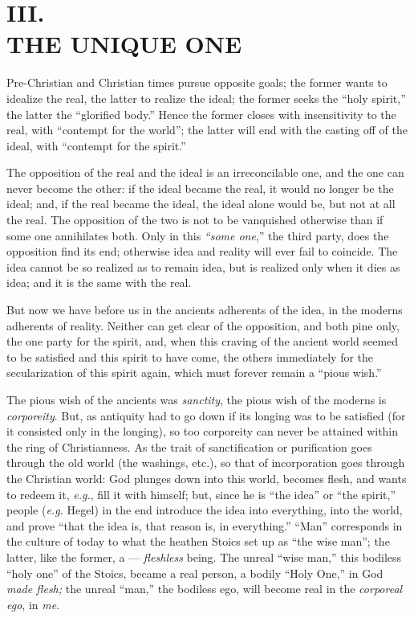 
\chapter[III. The Unique One]{\centering III.\\
THE UNIQUE ONE}

Pre-Christian and Christian times pursue opposite goals; the former wants to 
idealize the real, the latter to realize the ideal; the former seeks the 
``holy spirit,'' the latter the ``glorified body.'' Hence the former 
closes with insensitivity to the real, with ``contempt for the world''; the 
latter will end with the casting off of the ideal, with ``contempt for the 
spirit.''

The opposition of the real and the ideal is an irreconcilable one, and the one 
can never become the other: if the ideal became the real, it would no longer 
be the ideal; and, if the real became the ideal, the ideal alone would be, but 
not at all the real. The opposition of the two is not to be vanquished 
otherwise than if some one annihilates both. Only in this \textit{``some 
one},'' the third party, does the opposition find its end; otherwise idea and 
reality will ever fail to coincide. The idea cannot be so realized as to 
remain idea, but is realized only when it dies as idea; and it is the same 
with the real.

But now we have before us in the ancients adherents of the idea, in the 
moderns adherents of reality. Neither can get clear of the opposition, and 
both pine only, the one party for the spirit, and, when this craving of the 
ancient world seemed to be satisfied and this spirit to have come, the others 
immediately for the secularization of this spirit again, which must forever 
remain a ``pious wish.''

The pious wish of the ancients was \textit{sanctity}, the pious wish of the 
moderns is \textit{corporeity}. But, as antiquity had to go down if its 
longing was to be satisfied (for it consisted only in the longing), so too 
corporeity can never be attained within the ring of Christianness. As the 
trait of sanctification or purification goes through the old world (the 
washings, etc.), so that of incorporation goes through the Christian world: 
God plunges down into this world, becomes flesh, and wants to redeem it, 
\textit{e.g.}, fill it with himself; but, since he is ``the idea'' or 
``the spirit,'' people (\textit{e.g.} Hegel) in the end introduce the idea 
into everything, into the world, and prove ``that the idea is, that reason 
is, in everything.'' ``Man'' corresponds in the culture of today to what 
the heathen Stoics set up as ``the wise man''; the latter, like the former, 
a --- \textit{fleshless} being. The unreal ``wise man,'' this bodiless 
``holy one'' of the Stoics, became a real person, a bodily ``Holy One,'' 
in God \textit{made flesh;} the unreal ``man,'' the bodiless ego, will 
become real in the \textit{corporeal ego}, in \textit{me}.

